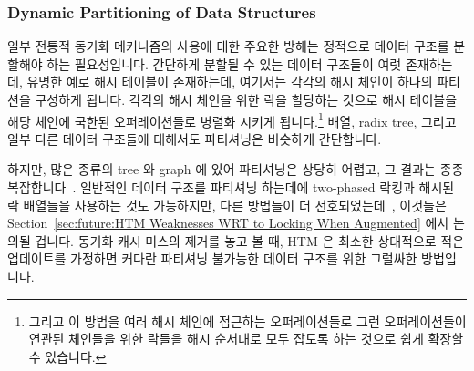 \subsubsection{Dynamic Partitioning of Data Structures}
\label{sec:future:Dynamic Partitioning of Data Structures}

일부 전통적 동기화 메커니즘의 사용에 대한 주요한 방해는 정적으로 데이터 구조를
분할해야 하는 필요성입니다.
간단하게 분할될 수 있는 데이터 구조들이 여럿 존재하는데, 유명한 예로 해시
테이블이 존재하는데, 여기서는 각각의 해시 체인이 하나의 파티션을 구성하게
됩니다.
각각의 해시 체인을 위한 락을 할당하는 것으로 해시 테이블을 해당 체인에 국한된
오퍼레이션들로 병렬화 시키게 됩니다.\footnote{
	그리고 이 방법을 여러 해시 체인에 접근하는 오퍼레이션들로 그런
	오퍼레이션들이 연관된 체인들을 위한 락들을 해시 순서대로 모두 잡도록
	하는 것으로 쉽게 확장할 수 있습니다.}
배열, radix tree, 그리고 일부 다른 데이터 구조들에 대해서도 파티셔닝은 비슷하게
간단합니다.
\iffalse

A major obstacle to the use of some conventional synchronization mechanisms
is the need to statically partition data structures.
There are a number of data structures that are trivially
partitionable, with the most prominent example being hash tables,
where each hash chain constitutes a partition.
Allocating a lock for each hash chain then trivially parallelizes
the hash table for operations confined to a given chain.\footnote{
	And it is also easy to extend this scheme to operations accessing
	multiple hash chains by having such operations acquire the
	locks for all relevant chains in hash order.}
Partitioning is similarly trivial for arrays, radix trees, and a few
other data structures.
\fi

하지만, 많은 종류의 tree 와 graph 에 있어 파티셔닝은 상당히 어렵고, 그 결과는
종종 복잡합니다~\cite{Ellis80}.
일반적인 데이터 구조를 파티셔닝 하는데에 two-phased 락킹과 해시된 락 배열들을
사용하는 것도 가능하지만, 다른 방법들이 더
선호되었는데~\cite{DavidSMiller2006HashedLocking}, 이것들은
Section~\ref{sec:future:HTM Weaknesses WRT to Locking When Augmented}
에서 논의될 겁니다.
동기화 캐시 미스의 제거를 놓고 볼 때, HTM 은 최소한 상대적으로 적은 업데이트를
가정하면 커다란 파티셔닝 불가능한 데이터 구조를 위한 그럴싸한 방법입니다.
\iffalse

However, partitioning for many types of trees and graphs is quite
difficult, and the results are often quite complex~\cite{Ellis80}.
Although it is possible to use two-phased locking and hashed arrays
of locks to partition general data structures, other techniques
have proven preferable~\cite{DavidSMiller2006HashedLocking},
as will be discussed in
Section~\ref{sec:future:HTM Weaknesses WRT to Locking When Augmented}.
Given its avoidance of synchronization cache misses,
HTM is therefore a very real possibility for large non-partitionable
data structures, at least assuming relatively small updates.
\fi

